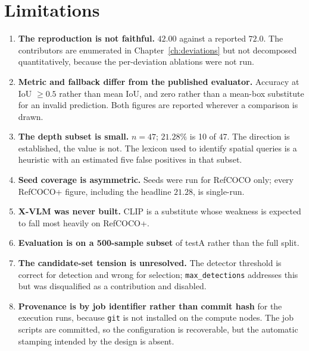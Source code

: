 \documentclass[12pt,a4paper,oneside]{report}
\begin{document}
\chapter{Limitations}
\label{ch:limitations}

\begin{enumerate}[leftmargin=1.6em, itemsep=4pt]
\item \textbf{The reproduction is not faithful.} $42.00$ against a reported $72.0$. The
contributors are enumerated in Chapter~\ref{ch:deviations} but not decomposed
quantitatively, because the per-deviation ablations were not run.

\item \textbf{Metric and fallback differ from the published evaluator.} Accuracy at
IoU $\geq 0.5$ rather than mean IoU, and zero rather than a mean-box substitute for an
invalid prediction. Both figures are reported wherever a comparison is drawn.

\item \textbf{The depth subset is small.} $n = 47$; $21.28\%$ is 10 of 47. The direction
is established, the value is not. The lexicon used to identify spatial queries is a
heuristic with an estimated five false positives in that subset.

\item \textbf{Seed coverage is asymmetric.} Seeds were run for RefCOCO only; every
RefCOCO+ figure, including the headline $21.28$, is single-run.

\item \textbf{X-VLM was never built.} CLIP is a substitute whose weakness is expected to
fall most heavily on RefCOCO+.

\item \textbf{Evaluation is on a 500-sample subset} of testA rather than the full split.

\item \textbf{The candidate-set tension is unresolved.} The detector threshold is correct
for detection and wrong for selection; \texttt{max\_detections} addresses this but was
disqualified as a contribution and disabled.

\item \textbf{Provenance is by job identifier rather than commit hash} for the execution
runs, because \texttt{git} is not installed on the compute nodes. The job scripts are
committed, so the configuration is recoverable, but the automatic stamping intended by
the design is absent.
\end{enumerate}
\end{document}
